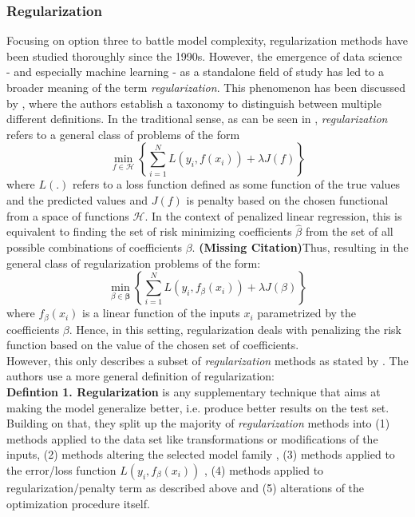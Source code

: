 \documentclass[12pt,a4paper]{article}
\newcommand{\MC}{\textbf{(Missing Citation)}} %
\begin{document}
\subsubsection{Regularization}

Focusing on option three to battle model complexity, regularization methods have been studied thoroughly since the 1990s. However, the emergence of data science - and especially machine learning - as a standalone field of study has led to a broader meaning of the term \textit{regularization}. This phenomenon has been discussed by \textcite{Taxonomy2017}, where the authors establish a taxonomy to distinguish between multiple different definitions. In the traditional sense, as can be seen in \textcite[167--170]{ESL2009}, \textit{regularization} refers to a general class of problems of the form
\[
\underset{f \in \mathcal{H}}{\min}\left\{\sum_{i=1}^N L(y_i, f(x_i)) + \lambda{J}(f)\right\}
\]
where $L(.)$ refers to a loss function defined as some function of the true values and the predicted values and $J(f)$ is penalty based on the chosen functional from a space of functions $\mathcal{H}$. In the context of penalized linear regression, this is equivalent to finding the set of risk minimizing coefficients $\hat{\beta}$ from the set of all possible combinations of coefficients $\beta$. \MC Thus, resulting in the general class of regularization problems of the form:
\[
\underset{\beta \in \boldsymbol{\beta}}{\min}\left\{\sum_{i=1}^N L(y_i, f_\beta(x_i)) + \lambda{J}(\beta)\right\}
\]
where $f_\beta(x_i)$ is a linear function of the inputs $x_i$ parametrized by the coefficients $\beta$. Hence, in this setting, regularization deals with penalizing the risk function based on the value of the chosen set of coefficients. \\
However, this only describes a subset of \textit{regularization} methods as stated by \textcite{Taxonomy2017}. The authors use a more general definition of regularization:\\

\textbf{Defintion 1. Regularization} is any supplementary technique that aims at making the model generalize better, i.e. produce better results on the test set.\\

Building on that, they split up the majority of \textit{regularization} methods into  (1) methods applied to the data set like transformations or modifications of the inputs, (2) methods altering the selected model family , (3) methods applied to the error/loss function $L(y_i, f_\beta(x_i))$ , (4) methods applied to regularization/penalty term as described above and (5) alterations of the optimization procedure itself. 
\end{document}
